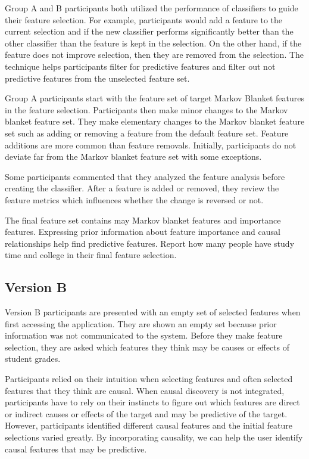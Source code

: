 Group A and B participants both utilized the performance of classifiers to guide their feature selection. For example, participants would add a feature to the current selection and if the new classifier performs significantly better than the other classifier than the feature is kept in the selection. On the other hand, if the feature does not improve selection, then they are removed from the selection. The technique helps participants filter for predictive features and filter out not predictive features from the unselected feature set. 

Group A participants start with the feature set of target Markov Blanket features in the feature selection. Participants then make minor changes to the Markov blanket feature set. They make elementary changes to the Markov blanket feature set such as adding or removing a feature from the default feature set. Feature additions are more common than feature removals. Initially, participants do not deviate far from the Markov blanket feature set with some exceptions.

Some participants commented that they analyzed the feature analysis before creating the classifier. After a feature is added or removed, they review the feature metrics which influences whether the change is reversed or not.

The final feature set contains may Markov blanket features and importance features. Expressing prior information about feature importance and causal relationships help find predictive features. Report how many people have study time and college in their final feature selection.

\subsection { Version B }
Version B participants are presented with an empty set of selected features when first accessing the application. They are shown an empty set because prior information was not communicated to the system. Before they make feature selection, they are asked which features they think may be causes or effects of student grades.

Participants relied on their intuition when selecting features and often selected features that they think are causal. When causal discovery is not integrated, participants have to rely on their instincts to figure out which features are direct or indirect causes or effects of the target and may be predictive of the target. However, participants identified different causal features and the initial feature selections varied greatly. By incorporating causality, we can help the user identify causal features that may be predictive.

